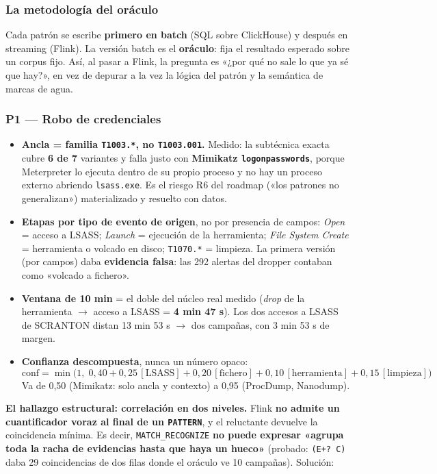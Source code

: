\documentclass[11pt,a4paper]{article}
\newcommand{\cod}[1]{\texttt{#1}}
\newcommand{\flecha}{$\rightarrow$}
\begin{document}
\subsubsection*{La metodología del oráculo}
Cada patrón se escribe \textbf{primero en batch} (SQL sobre ClickHouse) y después en streaming (Flink).
La versión batch es el \textbf{oráculo}: fija el resultado esperado sobre un corpus fijo. Así, al pasar a
Flink, la pregunta es «¿por qué no sale lo que ya sé que hay?», en vez de depurar a la vez la lógica del
patrón y la semántica de marcas de agua.

\subsubsection*{P1 — Robo de credenciales}

\begin{itemize}
  \item \textbf{Ancla = familia \cod{T1003.*}, no \cod{T1003.001}.} Medido: la subtécnica exacta cubre
        \textbf{6 de 7} variantes y falla justo con \textbf{Mimikatz \cod{logonpasswords}}, porque Meterpreter lo
        ejecuta dentro de su propio proceso y no hay un proceso externo abriendo \cod{lsass.exe}. Es el riesgo R6
        del roadmap («los patrones no generalizan») materializado y resuelto con datos.
  \item \textbf{Etapas por tipo de evento de origen}, no por presencia de campos:
        \textit{Open} = acceso a LSASS; \textit{Launch} = ejecución de la herramienta; \textit{File System Create} =
        herramienta o volcado en disco; \cod{T1070.*} = limpieza. La primera versión (por campos) daba
        \textbf{evidencia falsa}: las 292 alertas del dropper contaban como «volcado a fichero».
  \item \textbf{Ventana de 10 min} = el doble del núcleo real medido (\textit{drop} de la herramienta \flecha{}
        acceso a LSASS = \textbf{4 min 47 s}). Los dos accesos a LSASS de SCRANTON distan 13 min 53 s
        \flecha{} dos campañas, con 3 min 53 s de margen.
  \item \textbf{Confianza descompuesta}, nunca un número opaco:
\[
\text{conf} = \min\bigl(1,\; 0{,}40 + 0{,}25\,[\text{LSASS}] + 0{,}20\,[\text{fichero}] + 0{,}10\,[\text{herramienta}] + 0{,}15\,[\text{limpieza}]\bigr)
\]
        Va de 0,50 (Mimikatz: solo ancla y contexto) a 0,95 (ProcDump, Nanodump).
\end{itemize}

\textbf{El hallazgo estructural: correlación en dos niveles.}
Flink \textbf{no admite un cuantificador voraz al final de un \cod{PATTERN}}, y el reluctante devuelve la
coincidencia mínima. Es decir, \cod{MATCH\_RECOGNIZE} \textbf{no puede expresar «agrupa toda la racha de
evidencias hasta que haya un hueco»} (probado: \cod{(E+? C)} daba 29 coincidencias de dos filas donde el
oráculo ve 10 campañas). Solución:
\end{document}
